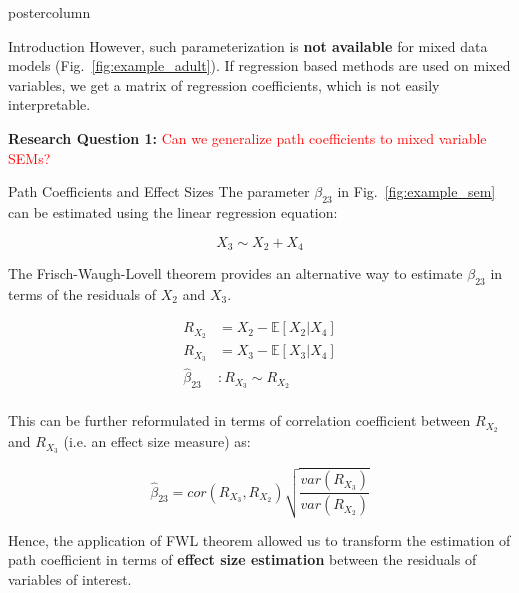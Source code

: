 \documentclass{beamer}
\begin{document}
\begin{frame}
\begin{columns}
\begin{column}{.33\textwidth}
\begin{beamercolorbox}[center]{postercolumn}
\begin{minipage}{.98\textwidth}
{\begin{myblock}{Introduction}
		However, such parameterization is \textbf{not available} for
		mixed data models (Fig.~\ref{fig:example_adult}). If regression
		based methods are used on mixed variables, we get a matrix of
		regression coefficients, which is not easily interpretable.

		\vspace{1em}

		\textbf{Research Question 1:} \textcolor{red}{Can we generalize path coefficients to mixed variable SEMs?}
	\end{myblock}\vfill
	\begin{myblock}{Path Coefficients and Effect Sizes}
		The parameter $ \beta_{23} $ in Fig.~\ref{fig:example_sem} can be estimated using the linear
		regression equation:
		
		\begin{equation*}
			X_3 \sim X_2 + X_4
		\end{equation*}
	
		The Frisch-Waugh-Lovell theorem \citep{Frisch1933} provides an alternative way to 
		estimate $ \beta_{23} $ in terms of the residuals of $ X_2 $ and $ X_3 $.

		\begin{equation*}
			\begin{split}
				R_{X_2} &= X_2 - \mathbb{E}[X_2 | X_4] \\
				R_{X_3} &= X_3 - \mathbb{E}[X_3 | X_4] \\
				\hat{\beta}_{23} &: R_{X_3} \sim R_{X_2} \\
			\end{split}
		\end{equation*}

		This can be further reformulated in terms of correlation coefficient between $ R_{X_2} $ and $ R_{X_3} $ (i.e. an effect size measure) as:

		\begin{equation*}
			\hat{\beta}_{23} = cor(R_{X_3}, R_{X_2}) \sqrt{\frac{var(R_{X_3})}{var(R_{X_2})}}
		\end{equation*}

		\vspace{1em}
		
		Hence, the application of FWL theorem allowed us to transform the estimation of path coefficient in terms of
		\textbf{effect size estimation} between the residuals of variables of interest.
		
	\end{myblock}\vfill
		}\end{minipage}\end{beamercolorbox}
	\end{column}


\end{columns}
\end{frame}
\end{document}
